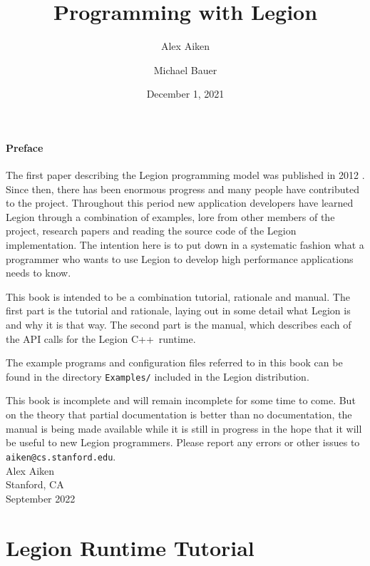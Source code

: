 \documentclass[11pt]{book}
\newcommand{\legionbook}[1]{{\tt Examples/#1}}
\newcommand{\Cpp}{C++}
\begin{document}
\title{Programming with Legion}
\author{Alex Aiken \and Michael Bauer}
\date{December 1, 2021}
\maketitle

\subsection*{Preface}

The first paper describing the Legion programming model
was published in 2012 \cite{Legion12}.  Since then, there has been
enormous progress and many people have contributed to
the project.  Throughout this period new application developers have
learned Legion through a combination of examples, lore from other
members of the project, research papers and reading the source code of
the Legion implementation.  The intention here is to put down in 
a systematic fashion what a programmer who wants to use
Legion to develop high performance applications needs to know.

This book is intended to be a combination tutorial, rationale and
manual.  The first part is the tutorial and rationale, laying out in some
detail what Legion is and why it is that way.  The second part is the manual, which describes
each of the API calls for the Legion \Cpp\ runtime.

The example programs and configuration files referred to in this book can be found in the directory
\legionbook{} included in the Legion distribution.

This book is incomplete and will remain incomplete for
some time to come.  But on the theory that partial documentation is better than no
documentation, the manual is being made available while it is
still in progress in the hope that it will be useful to new Legion
programmers.  Please report any errors or other issues to {\tt
  aiken@cs.stanford.edu}. \\[2in] Alex Aiken\\ Stanford, CA \\
September 2022

\tableofcontents

\part{Legion Runtime Tutorial}












\end{document}
